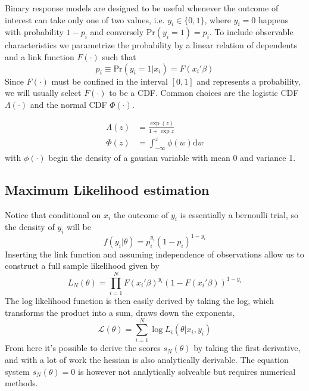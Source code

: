 Binary response models are designed to be useful whenever the outcome of interest can take only one of two values, i.e. $y_i \in \{0,1\}$, where $y_i=0$ happens with probability $1-p_i$ and conversely $\textrm{Pr}(y_i = 1)=p_i$. To include observable characteristics we parametrize the probability by a linear relation of dependents and a link function $F(\cdot)$ such that
\begin{equation}
p_i \equiv \textrm{Pr}(y_i = 1 | x_i) = F(x_i'\beta)
\end{equation}
Since $F(\cdot)$ must be confined in the interval $[0,1]$ and represents a probability, we will usually select $F(\cdot)$ to be a CDF. Common choices are the logistic CDF $\Lambda(\cdot)$ and the normal CDF $\Phi(\cdot)$.

\begin{align*}
\Lambda(z) &= \frac{\exp(z)}{1 + \exp{z}} \\
\Phi(z) &= \int_{-\infty}^{z} \phi(w) \textrm{d}w
\end{align*}
with $\phi(\cdot)$ begin the density of a gausian variable with mean 0 and variance 1.

\subsection{Maximum Likelihood estimation}
Notice that conditional on $x_i$ the outcome of $y_i$ is essentially a bernoulli trial, so the density of $y_i$ will be
\begin{equation}
f(y_i|\theta) = p_i^{y_i}(1-p_i)^{1-y_i}
\end{equation}
Inserting the link function and assuming independence of observations allow us to construct a full sample likelihood given by
\begin{equation*}
L_N(\theta) = \prod_{i=1}^N   F(x_i' \beta)^{y_i}(1-F(x_i'\beta))^{1-y_i}
\end{equation*}
The log likelihood function is then easily derived by taking the log, which transforms the product into a sum, draws down the exponents,
\begin{equation}
\mathcal{L}(\theta) = \sum_{i=1}^N \log L_i(\theta|x_i, y_i)
\end{equation}
From here it's possible to derive the scores $s_N(\theta)$ by taking the first derivative, and with a lot of work the hessian is also analytically derivable. The equation system $s_N(\theta)=0$ is however not analytically solveable but requires numerical methods.

